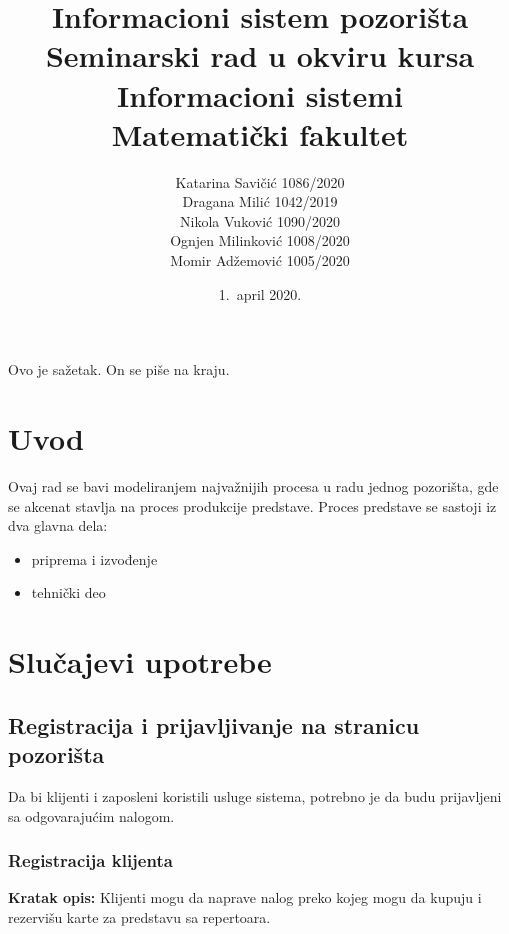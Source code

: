 \documentclass[a4paper]{article}
\begin{document}
\title{Informacioni sistem pozorišta\\ \small{Seminarski rad u okviru kursa\\Informacioni sistemi\\ Matematički fakultet}}

\author{
Katarina Savičić 1086/2020\\
Dragana Milić 1042/2019\\
Nikola Vuković 1090/2020\\
Ognjen Milinković 1008/2020\\
Momir Adžemović 1005/2020
}

\date{1.~april 2020.}

\maketitle

\abstract

Ovo je sažetak. On se piše na kraju.

\newpage

\tableofcontents

\newpage

\section{Uvod}
Ovaj rad se bavi modeliranjem najvažnijih procesa u radu jednog pozorišta, gde se akcenat
stavlja na proces produkcije predstave. Proces predstave se sastoji iz dva glavna 
dela\cite{hamilton_theatre_producing_the_drama}:
\begin{itemize}
  \item priprema i izvođenje
  \item tehnički deo
\end{itemize}

\section{Slučajevi upotrebe}

\subsection{Registracija i prijavljivanje na stranicu pozorišta}
Da bi klijenti i zaposleni koristili usluge sistema, potrebno je da budu prijavljeni sa odgovarajućim nalogom.

\subsubsection{Registracija klijenta}
\noindent\textbf{Kratak opis:} Klijenti mogu da naprave nalog preko kojeg mogu da kupuju i rezervišu
  karte za predstavu sa repertoara.
\end{document}
